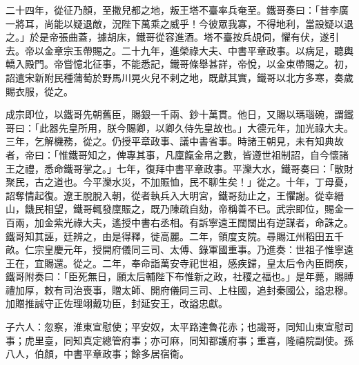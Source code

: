 \begin{pinyinscope}
 二十四年，從征乃顏，至撒兒都之地，叛王塔不臺率兵奄至。鐵哥奏曰：「昔李廣一將耳，尚能以疑退敵，況陛下萬乘之威乎！今彼眾我寡，不得地利，當設疑以退之。」於是帝張曲蓋，據胡床，鐵哥從容進酒。塔不臺按兵覘伺，懼有伏，遂引去。帝以金章宗玉帶賜之。二十九年，進榮祿大夫、中書平章政事。以病足，聽輿轎入殿門。帝嘗憶北征事，不能悉記，鐵哥條舉甚詳，帝悅，以金束帶賜之。初，詔遣宋新附民種蒲萄於野馬川晃火兒不剌之地，既獻其實，鐵哥以北方多寒，奏歲賜衣服，從之。



 成宗即位，以鐵哥先朝舊臣，賜銀一千兩、鈔十萬貫。他日，又賜以瑪瑙碗，謂鐵哥曰：「此器先皇所用，朕今賜卿，以卿久侍先皇故也。」大德元年，加光祿大夫。三年，乞解機務，從之。仍授平章政事、議中書省事。時諸王朝見，未有知典故者，帝曰：「惟鐵哥知之，俾專其事，凡廩餼金帛之數，皆遵世祖制詔，自今懷諸王之禮，悉命鐵哥掌之。」七年，復拜中書平章政事。平灤大水，鐵哥奏曰：「散財聚民，古之道也。今平灤水災，不加賑恤，民不聊生矣！」從之。十年，丁母憂，詔奪情起復。遼王脫脫入朝，從者執兵入大明宮，鐵哥劾止之，王懼謝。從幸縉山，饑民相望，鐵哥輒發廩賑之，既乃陳疏自劾，帝稱善不已。武宗即位，賜金一百兩，加金紫光祿大夫，遙授中書右丞相。有訴寧遠王闊闊出有逆謀者，命誅之。鐵哥知其誣，廷辨之，由是得釋，徙高麗。二年，領度支院。尋賜江州稻田五千畝。仁宗皇慶元年，授開府儀同三司、太傅、錄軍國重事。乃進奏：世祖子惟寧遠王在，宜賜還。從之。二年，奉命詣萬安寺祀世祖，感疾歸，皇太后令內臣問疾，鐵哥附奏曰：「臣死無日，願太后輔陛下布惟新之政，社稷之福也。」是年薨，賜賻禮加厚，敕有司治喪事，贈太師、開府儀同三司、上柱國，追封秦國公，謚忠穆。加贈推誠守正佐理翊戴功臣，封延安王，改謚忠獻。



 子六人：忽察，淮東宣慰使；平安奴，太平路達魯花赤；也識哥，同知山東宣慰司事；虎里臺，同知真定總管府事；亦可麻，同知都護府事；重喜，隆禧院副使。孫八人，伯顏，中書平章政事；餘多居宿衛。



\end{pinyinscope}
